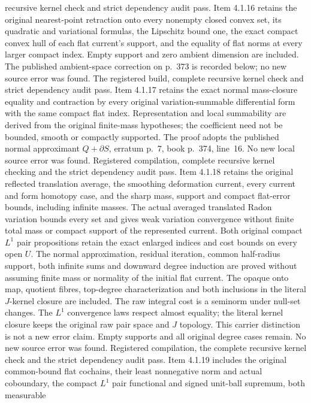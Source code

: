 \documentclass[11pt]{article}
\begin{document}
\begin{itemize}
recursive kernel check and strict dependency audit pass.
Item 4.1.16 retains the original nearest-point retraction onto every
nonempty closed convex set, its quadratic and variational formulas,
the Lipschitz bound one, the exact compact convex hull of each flat
current's support, and the equality of flat norms at every larger
compact index. Empty support and zero ambient dimension are included.
The published ambient-space correction on p.~373 is recorded below;
no new source error was found. The registered build, complete
recursive kernel check and strict dependency audit pass.
Item 4.1.17 retains the exact normal mass-closure equality and
contraction by every original variation-summable differential form
with the same compact flat index. Representation and local
summability are derived from the original finite-mass hypotheses;
the coefficient need not be bounded, smooth or compactly supported.
The proof adopts the published normal approximant $Q+\partial S$,
erratum p.~7, book p.~374, line~16. No new local source error was
found. Registered compilation, complete recursive kernel checking
and the strict dependency audit pass.
Item 4.1.18 retains the original reflected translation average,
the smoothing deformation current, every current and form homotopy
case, and the sharp mass, support and compact flat-error bounds,
including infinite masses. The actual averaged translated Radon
variation bounds every set and gives weak variation convergence
without finite total mass or compact support of the represented
current. Both original compact $L^1$ pair propositions retain the
exact enlarged indices and cost bounds on every open $U$. The
normal approximation, residual iteration, common half-radius support,
both infinite sums and downward degree induction are proved without
assuming finite mass or normality of the initial flat current.
The opaque onto map, quotient fibres, top-degree characterization
and both inclusions in the literal $J$-kernel closure are included.
The raw integral cost is a seminorm under null-set changes. The
$L^1$ convergence laws respect almost equality; the literal kernel
closure keeps the original raw pair space and $J$ topology.
This carrier distinction is not a new error claim. Empty supports
and all original degree cases remain. No new source error was
found. Registered compilation, the complete recursive kernel check
and the strict dependency audit pass.
Item 4.1.19 includes the original common-bound flat cochains,
their least nonnegative norm and actual coboundary, the compact
$L^1$ pair functional and signed unit-ball supremum, both measurable

\end{itemize}
\end{document}
